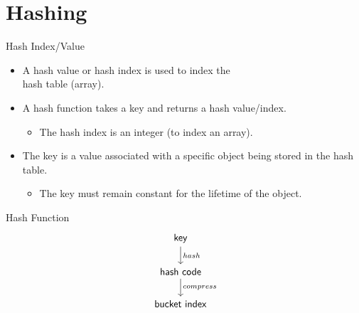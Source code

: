 \documentclass[14pt,aspectratio=1610]{beamer}
\begin{document}



  
\section{Hashing}

\begin{frame}{Hash Index/Value}
\begin{itemize}
\item<+->
  A hash value or hash index is used to index the\\ hash table (array).
\item<+->
  A hash function takes a key and returns a hash value/index.
  \begin{itemize}
  \item
    The hash index is an integer (to index an array).
  \end{itemize}
\item<+->
  The key is a value associated with a specific object being stored in the hash table.
  \begin{itemize}
  \item
    The key must remain constant for the lifetime of the object.
  \end{itemize}
\end{itemize}
\end{frame}

\begin{frame}[fragile]{Hash Function}
  \Large%
  \[
    \begin{tikzcd}[
    ]
        \mathsf{key} \arrow[d, "hash"] \\
        \mathsf{hash~code} \arrow[d, "compress"] \\
        \mathsf{bucket~index}
    \end{tikzcd}
  \]
\end{frame}
\end{document}
